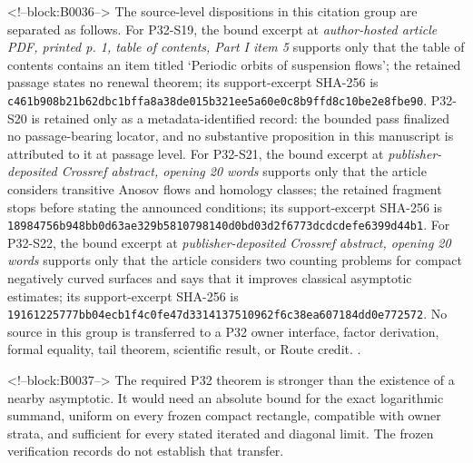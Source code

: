 \documentclass[11pt]{article}
\begin{document}
<!--block:B0036-->
The source-level dispositions in this citation group are separated as follows.
For P32-S19, the bound excerpt at \emph{author-hosted article PDF, printed p. 1, table of contents, Part I item 5} supports only that the table of contents contains an item titled `Periodic orbits of suspension flows'; the retained passage states no renewal theorem; its support-excerpt SHA-256 is \texttt{c461b908\allowbreak{}b21b62db\allowbreak{}c1bffa8a\allowbreak{}38de015b\allowbreak{}321ee5a6\allowbreak{}0e0c8b9f\allowbreak{}fd8c10be\allowbreak{}2e8fbe90}.
P32-S20 is retained only as a metadata-identified record: the bounded pass finalized no passage-bearing locator, and no substantive proposition in this manuscript is attributed to it at passage level.
For P32-S21, the bound excerpt at \emph{publisher-deposited Crossref abstract, opening 20 words} supports only that the article considers transitive Anosov flows and homology classes; the retained fragment stops before stating the announced conditions; its support-excerpt SHA-256 is \texttt{18984756\allowbreak{}b948bb0d\allowbreak{}63ae329b\allowbreak{}58107981\allowbreak{}40d0bd03\allowbreak{}d2f6773d\allowbreak{}cdcdefe6\allowbreak{}399d44b1}.
For P32-S22, the bound excerpt at \emph{publisher-deposited Crossref abstract, opening 20 words} supports only that the article considers two counting problems for compact negatively curved surfaces and says that it improves classical asymptotic estimates; its support-excerpt SHA-256 is \texttt{19161225\allowbreak{}777bb04e\allowbreak{}cb1f4c0f\allowbreak{}e47d3314\allowbreak{}13751096\allowbreak{}2f6c38ea\allowbreak{}607184dd\allowbreak{}0e772572}.
No source in this group is transferred to a P32 owner interface, factor derivation, formal equality, tail theorem, scientific result, or Route credit.
\citep{P32-S19,P32-S20,P32-S21,P32-S22}.

<!--block:B0037-->
The required P32 theorem is stronger than the existence of a nearby
asymptotic. It would need an absolute bound for the exact logarithmic
summand, uniform on every frozen compact rectangle, compatible with
owner strata, and sufficient for every stated iterated and diagonal
limit. The frozen verification records do not establish that transfer.
\end{document}
